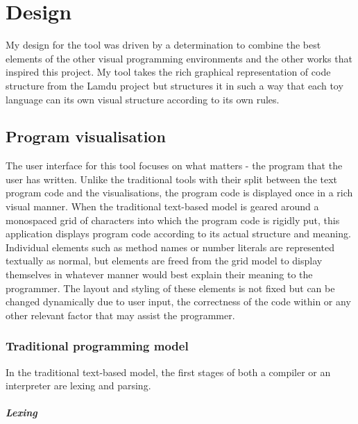 \chapter{Design}

My design for the tool was driven by a determination to combine the best elements of the other visual programming environments and the other works that inspired this project. My tool takes the rich graphical representation of code structure from the Lamdu project but structures it in such a way that each toy language can its own visual structure according to its own rules.

\section{Program visualisation}

The user interface for this tool focuses on what matters - the program that the user has written. Unlike the traditional tools with their split between the text program code and the visualisations, the program code is displayed once in a rich visual manner. When the traditional text-based model is geared around a monospaced grid of characters into which the program code is rigidly put, this application displays program code according to its actual structure and meaning. Individual elements such as method names or number literals are represented textually as normal, but elements are freed from the grid model to display themselves in whatever manner would best explain their meaning to the programmer. The layout and styling of these elements is not fixed but can be changed dynamically due to user input, the correctness of the code within or any other relevant factor that may assist the programmer.

\subsection{Traditional programming model}

In the traditional text-based model, the first stages of both a compiler or an interpreter are lexing and parsing.

\paragraph{Lexing}

